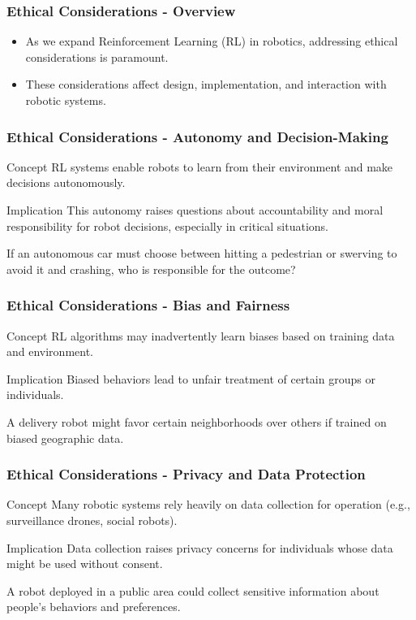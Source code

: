 \documentclass[aspectratio=169]{beamer}
\begin{document}
\begin{frame}[fragile]
  \frametitle{Ethical Considerations - Overview}
  \begin{itemize}
    \item As we expand Reinforcement Learning (RL) in robotics, addressing ethical considerations is paramount.
    \item These considerations affect design, implementation, and interaction with robotic systems.
  \end{itemize}
\end{frame}

\begin{frame}[fragile]
  \frametitle{Ethical Considerations - Autonomy and Decision-Making}
  \begin{block}{Concept}
    RL systems enable robots to learn from their environment and make decisions autonomously.
  \end{block}
  \begin{block}{Implication}
    This autonomy raises questions about accountability and moral responsibility for robot decisions, especially in critical situations.
  \end{block}
  \begin{example}
    If an autonomous car must choose between hitting a pedestrian or swerving to avoid it and crashing, who is responsible for the outcome?
  \end{example}
\end{frame}

\begin{frame}[fragile]
  \frametitle{Ethical Considerations - Bias and Fairness}
  \begin{block}{Concept}
    RL algorithms may inadvertently learn biases based on training data and environment.
  \end{block}
  \begin{block}{Implication}
    Biased behaviors lead to unfair treatment of certain groups or individuals.
  \end{block}
  \begin{example}
    A delivery robot might favor certain neighborhoods over others if trained on biased geographic data.
  \end{example}
\end{frame}

\begin{frame}[fragile]
  \frametitle{Ethical Considerations - Privacy and Data Protection}
  \begin{block}{Concept}
    Many robotic systems rely heavily on data collection for operation (e.g., surveillance drones, social robots).
  \end{block}
  \begin{block}{Implication}
    Data collection raises privacy concerns for individuals whose data might be used without consent.
  \end{block}
  \begin{example}
    A robot deployed in a public area could collect sensitive information about people's behaviors and preferences.
  \end{example}
\end{frame}
\end{document}
